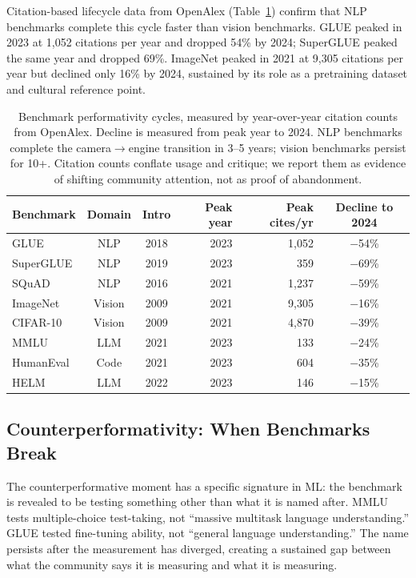 \documentclass{article}
\begin{document}
Citation-based lifecycle data from OpenAlex (Table~\ref{tab:lifespans}) confirm that NLP benchmarks complete this cycle faster than vision benchmarks. GLUE peaked in 2023 at 1,052 citations per year and dropped 54\% by 2024; SuperGLUE peaked the same year and dropped 69\%. ImageNet peaked in 2021 at 9,305 citations per year but declined only 16\% by 2024, sustained by its role as a pretraining dataset and cultural reference point.

\begin{table}[t]
\centering
\caption{Benchmark performativity cycles, measured by year-over-year citation counts from OpenAlex. Decline is measured from peak year to 2024. NLP benchmarks complete the camera$\to$engine transition in 3--5 years; vision benchmarks persist for 10+. Citation counts conflate usage and critique; we report them as evidence of shifting community attention, not as proof of abandonment.}
\label{tab:lifespans}
\small
\begin{tabular}{@{}lccrrc@{}}
\toprule
Benchmark & Domain & Intro & Peak year & Peak cites/yr & Decline to 2024 \\
\midrule
GLUE & NLP & 2018 & 2023 & 1{,}052 & $-$54\% \\
SuperGLUE & NLP & 2019 & 2023 & 359 & $-$69\% \\
SQuAD & NLP & 2016 & 2021 & 1{,}237 & $-$59\% \\
\midrule
ImageNet & Vision & 2009 & 2021 & 9{,}305 & $-$16\% \\
CIFAR-10 & Vision & 2009 & 2021 & 4{,}870 & $-$39\% \\
\midrule
MMLU & LLM & 2021 & 2023 & 133 & $-$24\% \\
HumanEval & Code & 2021 & 2023 & 604 & $-$35\% \\
HELM & LLM & 2022 & 2023 & 146 & $-$15\% \\
\bottomrule
\end{tabular}
\end{table}

\subsection{Counterperformativity: When Benchmarks Break}

The counterperformative moment has a specific signature in ML: the benchmark is revealed to be testing something other than what it is named after. MMLU tests multiple-choice test-taking, not ``massive multitask language understanding.'' GLUE tested fine-tuning ability, not ``general language understanding.'' The name persists after the measurement has diverged, creating a sustained gap between what the community says it is measuring and what it is measuring.
\end{document}
